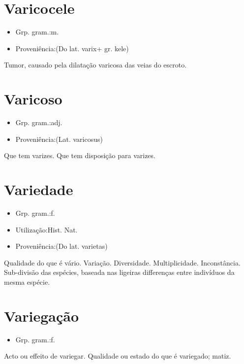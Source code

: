 \documentclass{article}
\begin{document}
\section{Varicocele}
\begin{itemize}
\item {Grp. gram.:m.}
\end{itemize}
\begin{itemize}
\item {Proveniência:(Do lat. \textunderscore varix\textunderscore  + gr. \textunderscore kele\textunderscore )}
\end{itemize}
Tumor, causado pela dilatação varicosa das veias do escroto.
\section{Varicoso}
\begin{itemize}
\item {Grp. gram.:adj.}
\end{itemize}
\begin{itemize}
\item {Proveniência:(Lat. \textunderscore varicosus\textunderscore )}
\end{itemize}
Que tem varizes.
Que tem disposição para varizes.
\section{Variedade}
\begin{itemize}
\item {Grp. gram.:f.}
\end{itemize}
\begin{itemize}
\item {Utilização:Hist. Nat.}
\end{itemize}
\begin{itemize}
\item {Proveniência:(Do lat. \textunderscore varietas\textunderscore )}
\end{itemize}
Qualidade do que é vário.
Variação.
Diversidade.
Multiplicidade.
Inconstância.
Sub-divisão das espécies, baseada nas ligeiras differenças entre indivíduos da mesma espécie.
\section{Variegação}
\begin{itemize}
\item {Grp. gram.:f.}
\end{itemize}
Acto ou effeito de variegar.
Qualidade ou estado do que é variegado; matiz.
\end{document}
